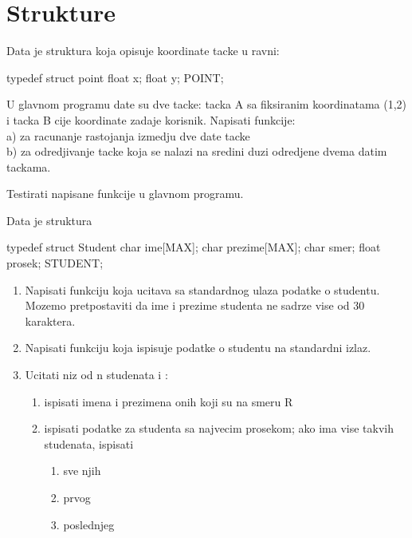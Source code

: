
\section{Strukture}

\begin{Exercise}[label=v2.5_01] 
Data je struktura koja opisuje koordinate
tacke u ravni:

\begin{ckod}
typedef struct point
{
float x;
float y;
} POINT;
\end{ckod}

U glavnom programu date su dve tacke: tacka
A sa fiksiranim koordinatama (1,2) i tacka B
cije koordinate zadaje korisnik. Napisati
funkcije:\\
a) za racunanje rastojanja izmedju dve date tacke\\
b) za odredjivanje tacke koja se nalazi na
sredini duzi odredjene dvema datim tackama.

Testirati napisane funkcije u glavnom programu.

\end{Exercise}
\begin{Answer}[ref=v2.5_01]
\end{Answer}

\begin{Exercise}[label=v2.5_02] 
  Data je struktura
\begin{ckod}
    typedef struct Student
    {
      char ime[MAX];
      char prezime[MAX];
      char smer;
      float prosek;
    } STUDENT;
  \end{ckod}
  \begin{enumerate}
  
\item  Napisati funkciju koja ucitava sa standardnog ulaza podatke o studentu. Mozemo pretpostaviti da 
    ime i prezime studenta ne sadrze vise od 30 karaktera.
\item Napisati funkciju koja ispisuje podatke o studentu na standardni izlaz.
\item Ucitati niz od n studenata i :
\begin{enumerate}
\item ispisati imena i prezimena onih koji su na smeru R
      \item ispisati podatke za studenta sa najvecim prosekom; ako ima vise takvih studenata, ispisati 
\begin{enumerate}
         \item sve njih 
	 \item prvog 
	 \item poslednjeg 
\end{enumerate}
\end{enumerate}
  \end{enumerate}

\end{Exercise}
\begin{Answer}[ref=v2.5_02]
\end{Answer}


